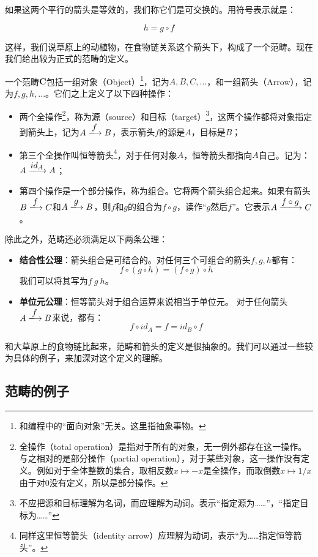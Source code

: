 \documentclass{article}
\begin{document}
如果这两个平行的箭头是等效的，我们称它们是可交换的。用符号表示就是：

\[
h = g \circ f
\]

这样，我们说草原上的动植物，在食物链关系这个箭头下，构成了一个范畴。现在我们给出较为正式的范畴的定义。

 
\begin{definition}
一个范畴$\pmb{C}$包括一组对象（Object）\footnote{和编程中的“面向对象”无关。这里指抽象事物。}，记为$A, B, C, ...$，和一组箭头（Arrow），记为$f, g, h, ...$。它们之上定义了以下四种操作：
\begin{itemize}
\item 两个全操作\footnote{全操作（total operation）是指对于所有的对象，无一例外都存在这一操作。与之相对的是部分操作（partial operation），对于某些对象，这一操作没有定义。例如对于全体整数的集合，取相反数$x \mapsto -x$是全操作，而取倒数$x \mapsto 1/x$由于对0没有定义，所以是部分操作。}，称为源（source）和目标（target）\footnote{不应把源和目标理解为名词，而应理解为动词。表示“指定源为……”，“指定目标为……”}，这两个操作都将对象指定到箭头上，记为$A \arrowto{f} B$，表示箭头$f$的源是$A$，目标是$B$；
\item 第三个全操作叫恒等箭头\footnote{同样这里恒等箭头（identity arrow）应理解为动词，表示“为……指定恒等箭头”。}，对于任何对象$A$，恒等箭头都指向$A$自己。记为：$A \arrowto{id_A} A$；
\item 第四个操作是一个部分操作，称为组合。它将两个箭头组合起来。如果有箭头$B \arrowto{f} C$和$A \arrowto{g} B$，则$f$和$g$的组合为$f \circ g$，读作“$g$然后$f$”。它表示$A \arrowto{f \circ g} C$。
\end{itemize}

除此之外，范畴还必须满足以下两条公理：

\begin{itemize}
\item \textbf{结合性公理}：箭头组合是可结合的。对任何三个可组合的箭头$f, g, h$都有：
\[
f \circ (g \circ h) = (f \circ g) \circ h
\]
我们可以将其写为$f\ g\ h$。
\item \textbf{单位元公理}：恒等箭头对于组合运算来说相当于单位元。
对于任何箭头$A \arrowto{f} B$来说，都有：
\[
f \circ id_A = f = id_B \circ f
\]
\end{itemize}
\end{definition}

和大草原上的食物链比起来，范畴和箭头的定义是很抽象的。我们可以通过一些较为具体的例子，来加深对这个定义的理解。

\subsection{范畴的例子}
\end{document}
